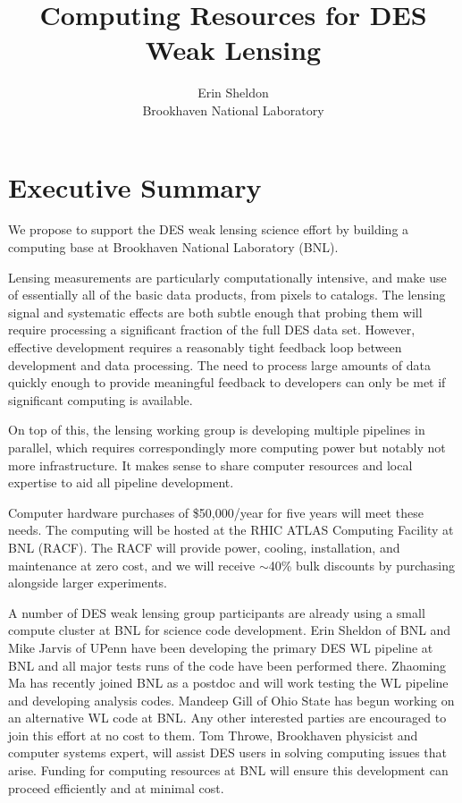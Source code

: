 \documentclass[12pt]{article}
\begin{document}
\title{Computing Resources for DES Weak Lensing}
\author{Erin Sheldon\\{\normalsize Brookhaven National Laboratory}}

\date{}
\maketitle


\section{Executive Summary}

We propose to support the DES weak lensing science effort by building a
computing base at Brookhaven National Laboratory (BNL).  

Lensing measurements are particularly computationally intensive, and make use
of essentially all of the basic data products, from pixels to catalogs.  The
lensing signal and systematic effects are both subtle enough that probing them
will require processing a significant fraction of the full DES data set.
However, effective development requires a reasonably tight feedback loop
between development and data processing.  The need to process large amounts
of data quickly enough to provide meaningful feedback to developers 
can only be met if significant computing is available.

On top of this, the lensing working group is developing multiple pipelines in
parallel, which requires correspondingly more computing power but notably not
more infrastructure.  It makes sense to share computer resources and local
expertise to aid all pipeline development.

Computer hardware purchases of \$50,000/year for five years will meet these
needs.  The computing will be hosted at the RHIC ATLAS Computing Facility at
BNL (RACF).  The RACF will provide power, cooling, installation, and
maintenance at zero cost, and we will receive $\sim$40\% bulk discounts by
purchasing alongside larger experiments.

A number of DES weak lensing group participants are already using a small
compute cluster at BNL for science code development.  Erin Sheldon of BNL and
Mike Jarvis of UPenn have been developing the primary DES WL pipeline at BNL
and all major tests runs of the code have been performed there.  Zhaoming Ma
has recently joined BNL as a postdoc and will work testing the WL pipeline and
developing analysis codes.  Mandeep Gill of Ohio State has begun working on an
alternative WL code at BNL.  Any other interested parties are encouraged to
join this effort at no cost to them.  Tom Throwe, Brookhaven physicist and
computer systems expert, will assist DES users in solving computing issues that
arise.  Funding for computing resources at BNL will ensure this development can
proceed efficiently and at minimal cost.
\end{document}
